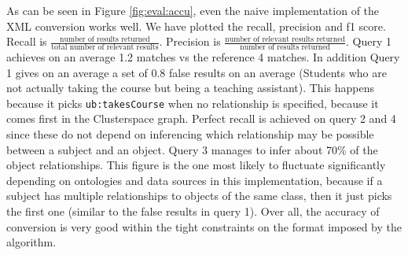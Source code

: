 \documentclass[journal]{IEEEtran}
\begin{document}
As can be seen in Figure \ref{fig:eval:accu}, even the naive implementation of
the XML conversion works well. We have plotted the recall, precision and f1 score. Recall is $\frac{\text{number of results returned}}{\text{total number of relevant results}}$. Precision is $\frac{\text{number of relevant results returned}}{\text{number of results returned}}$. Query 1 achieves on an average 1.2 matches vs
the reference 4 matches. In addition Query 1 gives on an average a set of 0.8
false results on an average (Students who are not actually taking the course
but being a teaching assistant). This happens because it picks
\texttt{ub:takesCourse} when no relationship is specified, because it comes
first in the Clusterspace graph. Perfect recall is achieved on query 2 and
4 since these do not depend on inferencing which relationship may be possible
between a subject and an object. Query 3 manages to infer about 70\% of the
object relationships. This figure is the one most likely to fluctuate
significantly depending on ontologies and data sources in this
implementation, because if a subject has multiple relationships to objects of
the same class, then it just picks the first one (similar to the false
results in query 1). Over all, the accuracy of conversion is very good within
the tight constraints on the format imposed by the algorithm.
\end{document}
